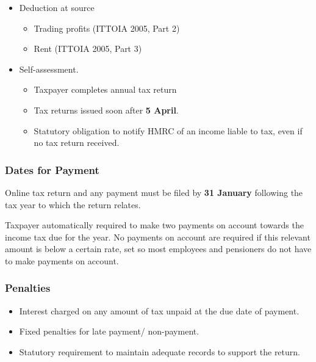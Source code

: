\documentclass[
]{article}
\providecommand{\tightlist}{%
  \setlength{\itemsep}{0pt}\setlength{\parskip}{0pt}}
\begin{document}
\begin{itemize}
\tightlist
\item
  Deduction at source

  \begin{itemize}
  \tightlist
  \item
    Trading profits (ITTOIA 2005, Part 2)
  \item
    Rent (ITTOIA 2005, Part 3)
  \end{itemize}
\item
  Self-assessment.

  \begin{itemize}
  \tightlist
  \item
    Taxpayer completes annual tax return
  \item
    Tax returns issued soon after \textbf{5 April}.
  \item
    Statutory obligation to notify HMRC of an income liable to tax, even
    if no tax return received.
  \end{itemize}
\end{itemize}

\hypertarget{dates-for-payment}{%
\subsubsection{Dates for Payment}\label{dates-for-payment}}

Online tax return and any payment must be filed by \textbf{31 January}
following the tax year to which the return relates.

Taxpayer automatically required to make two payments on account towards
the income tax due for the year. No payments on account are required if
this relevant amount is below a certain rate, set so most employees and
pensioners do not have to make payments on account.

\hypertarget{penalties}{%
\subsubsection{Penalties}\label{penalties}}

\begin{itemize}
\tightlist
\item
  Interest charged on any amount of tax unpaid at the due date of
  payment.
\item
  Fixed penalties for late payment/ non-payment.
\item
  Statutory requirement to maintain adequate records to support the
  return.
\end{itemize}
\end{document}
